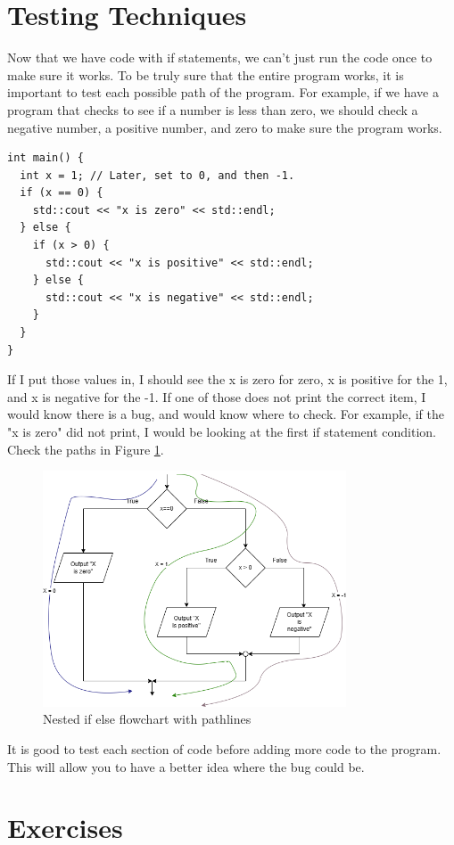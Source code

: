 \section{Testing Techniques}
Now that we have code with if statements, we can't just run the 
code once to make sure it works. To be truly sure that the entire
program works, it is important to test each possible path of the
program. For example, if we have a program that checks to see if
a number is less than zero, we should check a negative number, 
a positive number, and zero to make sure the program works. 

\begin{lstlisting}
int main() {
  int x = 1; // Later, set to 0, and then -1.
  if (x == 0) {
    std::cout << "x is zero" << std::endl;
  } else {
    if (x > 0) {
      std::cout << "x is positive" << std::endl;
    } else {
      std::cout << "x is negative" << std::endl;
    }
  }
}
\end{lstlisting}
If I put those values in, I should see the x is zero for zero, x is
positive for the 1, and x is negative for the -1. If one of those does not print the correct item, I would know there is a bug, and 
would know where to check. For example, if the "x is zero" did not print, I would be looking at the first if statement condition. Check
the paths in Figure \ref{fig:nestedpath}.

\begin{figure}[h]
    \centering
    \includegraphics[width=9cm]{images/nestedifflow - Path.png}
    \caption{Nested if else flowchart with pathlines}
    \label{fig:nestedpath}
\end{figure}
It is good to test each section of code before adding more code
to the program. This will allow you to have a better idea where the
bug could be.

\section{Exercises}
